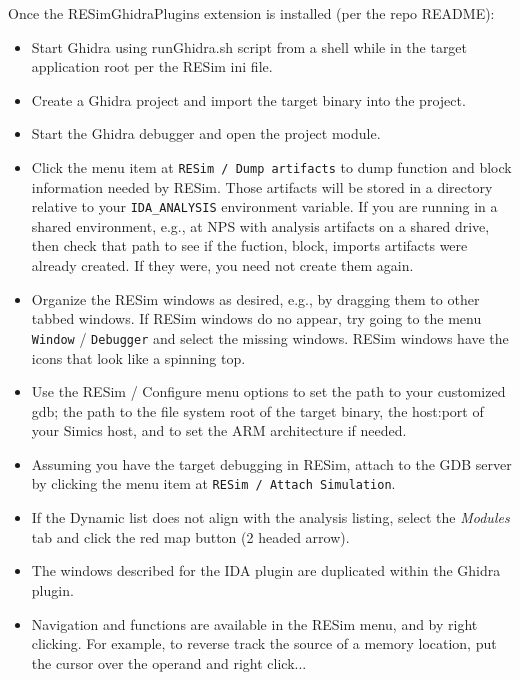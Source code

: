\documentclass[titlepage]{article}
\begin{document}
Once the RESimGhidraPlugins extension is installed (per the repo README): 
\begin{itemize}
\item Start Ghidra using runGhidra.sh script from a shell while in the target application root 
per the RESim ini file.

\item Create a Ghidra project and import the target binary into the project.

\item Start the Ghidra debugger and open the project module.

\item Click the menu item at {\tt RESim / Dump artifacts}  to dump function and block information
needed by RESim.  Those artifacts will be stored in a directory relative to your {\tt IDA\_ANALYSIS} environment variable.
If you are running in a shared environment, e.g., at NPS with analysis artifacts on a shared drive, then 
check that path to see if the fuction, block, imports artifacts were already created.  If they were, you need not create them again.

\item Organize the RESim windows
as desired, e.g., by dragging them to other tabbed windows.  If RESim windows do no appear, try going to the menu
{\tt Window} / {\tt Debugger} and select the missing windows.  RESim windows have the icons that look like a spinning top.

\item Use the RESim / Configure menu options to set the path to your customized gdb; the path to
the file system root of the target binary, the host:port of your Simics host, and to set the ARM architecture if needed.

\item Assuming you have the target debugging in RESim, attach to the GDB server by clicking the menu item at {\tt RESim / Attach Simulation}.

\item If the Dynamic list does not align with the analysis listing, select the \textit{Modules} tab and click the red map button (2 headed arrow).

\item The windows described for the IDA plugin are duplicated within the Ghidra plugin.

\item Navigation and functions are available in the RESim menu, and by right clicking.  For example, to reverse track
the source of a memory location, put the cursor over the operand and right click...


\end{itemize}
\end{document}
